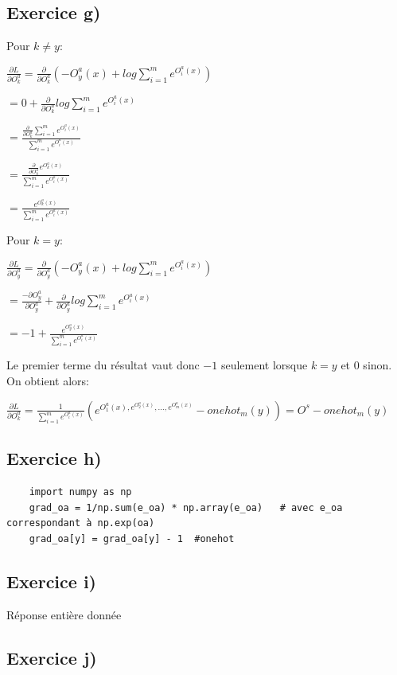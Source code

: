 \documentclass[a4paper,10pt]{article}
\begin{document}
\subsection{Exercice g)}
Pour $k \neq y$:

$\frac{\partial L}{\partial {O^a_k}} = \frac{\partial}{\partial O^a_k} ( -O^a_y (x)+ log \sum_{i=1}^{m} e^{O^a_i(x)})$

$= 0 + \frac{\partial}{\partial O^a_k} log \sum_{i=1}^{m} e^{O^a_i(x)}$

$= \frac{\frac{\partial}{\partial O^a_k} \sum_{i=1}^{m} e^{O^a_i(x)}}{\sum_{i=1}^{m} e^{O^a_i(x)}}$

$= \frac{\frac{\partial}{\partial O^a_k} e^{O^a_k(x)}}{\sum_{i=1}^{m} e^{O^a_i(x)}}$

$= \frac{e^{O^a_k(x)}}{\sum_{i=1}^{m} e^{O^a_i(x)}}$

Pour $k=y$:

$\frac{\partial L}{\partial {O^a_y}} = \frac{\partial}{\partial O^a_y} ( -O^a_y (x)+ log \sum_{i=1}^{m} e^{O^a_i(x)})$

$= \frac{-\partial O^a_y}{\partial O^a_y} + \frac{\partial}{\partial O^a_y} log \sum_{i=1}^{m} e^{O^a_i(x)}$

$= -1+\frac{e^{O^a_y(x)}}{\sum_{i=1}^{m} e^{O^a_i(x)}}$

Le premier terme du résultat vaut donc $-1$ seulement lorsque $k=y$ et 0 sinon. On obtient alors:

$\frac{\partial L}{\partial {O^a_k}} = \frac{1}{\sum_{i=1}^{m} e^{O^a_i(x)}} (e^{O^a_1(x), e^{O^a_2(x)}, ..., e^{O^a_m(x)}}- onehot_m(y)) = O^s - onehot_m(y)$

\subsection{Exercice h)}


\begin{verbatim}
	import numpy as np
	grad_oa = 1/np.sum(e_oa) * np.array(e_oa)   # avec e_oa correspondant à np.exp(oa)
	grad_oa[y] = grad_oa[y] - 1  #onehot
\end{verbatim}

\subsection{Exercice i)}
Réponse entière donnée

\subsection{Exercice j)} 
\end{document}
